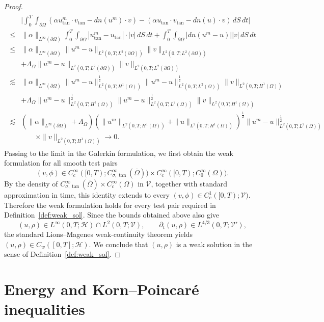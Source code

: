 \documentclass[11pt,reqno]{amsart}
\theoremstyle{plain}
\numberwithin{equation}{section}
\begin{document}
\begin{proof}
\begin{align}
\begin{split}
    &\bigg|\int_0^T\int_{\partial\Omega} (\alpha{u}^m_{\tan}\cdot{v}_{\tan}-d{n}(u^m)\cdot {v})-(\alpha u_{\tan}\cdot v_{\tan}-d{n}(u)\cdot v)\,dS\,dt\bigg|\\
    \le &\|\alpha\|_{L^\infty(\partial \Omega)}\int_0^T\int_{\partial\Omega}|u^m_{\tan}-u_{\tan}|\cdot |{v}|\,dS\,dt+\int_0^T\int_{\partial\Omega}|d{n}(u^m-u)||v|\,dS\,dt\\
    \le &\|\alpha\|_{L^\infty(\partial \Omega)}\|u^m-u\|_{L^2(0,T;L^2(\partial\Omega))}\|v\|_{L^2(0,T;L^2(\partial\Omega))}\\
    &+\Lambda_\Omega\|u^m-u\|_{L^2(0,T;L^2(\partial\Omega))}\|v\|_{L^2(0,T;L^2(\partial\Omega))}\\
    \lesssim &\|\alpha\|_{L^\infty(\partial\Omega)}\|u^m-u\|_{L^2(0,T;H^1(\Omega))}^\frac{1}{2}\|u^m-u\|^\frac{1}{2}_{L^2(0,T;L^2(\Omega))}\|{v}\|_{L^2(0,T;H^1(\Omega))}\\
    &+\Lambda_\Omega\|u^m-u\|_{L^2(0,T;H^1(\Omega))}^\frac{1}{2}\|u^m-u\|_{L^2(0,T;L^2(\Omega))}^\frac{1}{2}\|v\|_{L^2(0,T;H^1(\Omega))}\\
    \lesssim &(\|\alpha\|_{L^\infty(\partial\Omega)}+\Lambda_\Omega)
    (\|u^m\|_{L^2(0,T;H^1(\Omega))}+\|u\|_{L^2(0,T;H^1(\Omega))})^\frac{1}{2}
    \|u^m-u\|_{L^2(0,T;L^2(\Omega))}^\frac{1}{2}\\
    &\qquad \times\|v\|_{L^2(0,T;H^1(\Omega))}
    \longrightarrow 0.
    \end{split}
\end{align}
Passing to the limit in the Galerkin formulation, we first obtain the weak formulation
for all smooth test pairs
\[
(v,\phi)\in C_c^\infty([0,T);C^\infty_{\sigma,\tan}(\overline{\Omega}))
\times C_c^\infty([0,T);C_0^\infty(\Omega)).
\]
By the density of $C^\infty_{\sigma,\tan}(\overline{\Omega})\times C_c^\infty(\Omega)$ in $\mathcal V$, together with standard approximation in time, this identity extends to every $(v,\phi)\in C_c^1([0,T);\mathcal V)$. Therefore the weak formulation holds for every test pair required in Definition~\ref{def:weak_sol}.
Since the bounds obtained above also give
\[
(u,\rho)\in L^\infty(0,T;\mathcal H)\cap L^2(0,T;\mathcal{V}),
\qquad
\partial_t(u,\rho)\in L^{4/3}(0,T;\mathcal{V}'),
\]
the standard Lions--Magenes weak-continuity theorem yields $(u,\rho)\in C_w([0,T];\mathcal H)$. We conclude that $(u,\rho)$ is a weak solution in the sense of Definition~\ref{def:weak_sol}.

\end{proof}

\section{Energy and Korn--Poincar\'e inequalities}\label{sec4}
\end{document}
